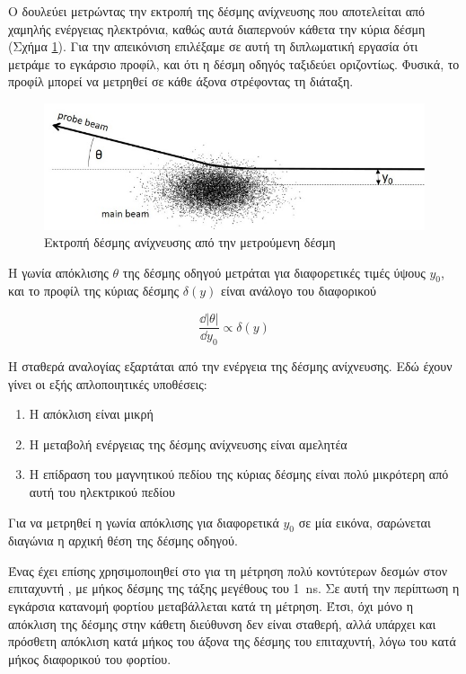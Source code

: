 Ο  δουλεύει μετρώντας την εκτροπή της δέσμης ανίχνευσης που αποτελείται από χαμηλής ενέργειας ηλεκτρόνια, καθώς αυτά διαπερνούν κάθετα την κύρια δέσμη (Σχήμα \ref{fig:beam-deflection}).
Για την απεικόνιση επιλέξαμε σε αυτή τη διπλωματική εργασία ότι μετράμε το εγκάρσιο προφίλ, και ότι η δέσμη οδηγός ταξιδεύει οριζοντίως. 
Φυσικά, το προφίλ μπορεί να μετρηθεί σε κάθε άξονα στρέφοντας τη διάταξη. 


\begin{figure}[tph]
\includegraphics[width=0.8\linewidth]{figures/Beam-deflection}
\centering
\caption{Εκτροπή δέσμης ανίχνευσης από την μετρούμενη δέσμη}
\label{fig:beam-deflection}
\end{figure}

Η γωνία απόκλισης $\theta$ της δέσμης οδηγού μετράται για διαφορετικές τιμές ύψους $y_0$, και το προφίλ της κύριας δέσμης $\delta (y)$ είναι ανάλογο του διαφορικού  \cite{Blokland2009}

\begin{equation} \label{eq:transverseProfile}
\frac{\dd{} |\theta|}{\dd y_0} \propto \delta (y)
\end{equation}

Η σταθερά αναλογίας εξαρτάται από την ενέργεια της δέσμης ανίχνευσης. 
Εδώ έχουν γίνει οι εξής απλοποιητικές υποθέσεις:
\begin{enumerate}
\item Η απόκλιση είναι μικρή
\item Η μεταβολή ενέργειας της δέσμης ανίχνευσης είναι αμελητέα 
\item Η επίδραση του μαγνητικού πεδίου της κύριας δέσμης είναι πολύ μικρότερη από αυτή του ηλεκτρικού πεδίου
\end{enumerate} 

Για να μετρηθεί η γωνία απόκλισης για διαφορετικά $y_0$ σε μία εικόνα, σαρώνεται διαγώνια η αρχική θέση της δέσμης οδηγού. 

Ένας  έχει επίσης χρησιμοποιηθεί στο  για τη μέτρηση πολύ κοντύτερων δεσμών στον επιταχυντή  \cite{Logatchov2006}, με μήκος δέσμης της τάξης μεγέθους του \SI{1}{\nano \second}.
Σε αυτή την περίπτωση η εγκάρσια κατανομή φορτίου μεταβάλλεται κατά τη μέτρηση.
Έτσι, όχι μόνο η απόκλιση της δέσμης στην κάθετη διεύθυνση δεν είναι σταθερή, αλλά υπάρχει και πρόσθετη απόκλιση κατά μήκος του άξονα της δέσμης του επιταχυντή, λόγω του κατά μήκος διαφορικού του φορτίου.

